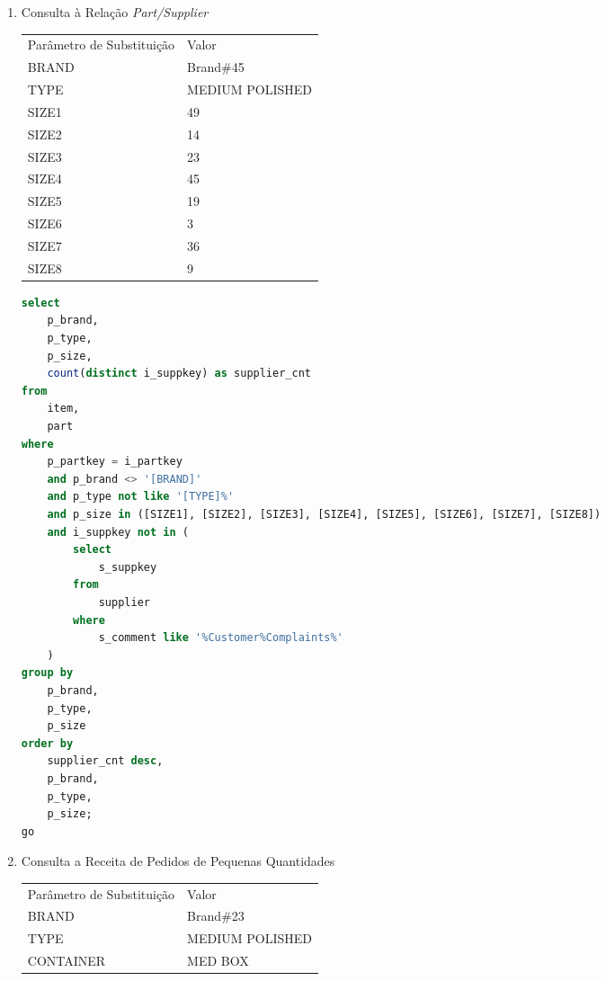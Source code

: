 \begin{enumerate}
\begin{lstlisting}[language=SQL]
select
	s_suppkey,
	s_name,
	s_address,
	s_phone,
	total_revenue
from
	supplier,
	revenue[STREAM_ID]
where
	s_suppkey = supplier_no
	and total_revenue = (
		select
			max(total_revenue)
		from
			revenue[STREAM_ID]
	)
order by
	s_suppkey;

drop view revenue[STREAM_ID];
	\end{lstlisting}

\item Consulta à Relação \textit{Part/Supplier}

\begin{tabular}{ll}
	Parâmetro de Substituição & Valor\\
	BRAND & Brand$\#$45\\
	TYPE & MEDIUM POLISHED \\
	SIZE1 & 49 \\
	SIZE2 & 14 \\
	SIZE3 & 23 \\
	SIZE4 & 45 \\
	SIZE5 & 19 \\
	SIZE6 &  3 \\
	SIZE7 & 36 \\
	SIZE8 &  9 \\
\end{tabular}

	\begin{lstlisting}[language=SQL]
select
    p_brand,
    p_type,
    p_size,
    count(distinct i_suppkey) as supplier_cnt
from
	item,
    part
where
    p_partkey = i_partkey
    and p_brand <> '[BRAND]'
    and p_type not like '[TYPE]%'
    and p_size in ([SIZE1], [SIZE2], [SIZE3], [SIZE4], [SIZE5], [SIZE6], [SIZE7], [SIZE8])
    and i_suppkey not in (
        select
            s_suppkey
        from
            supplier
        where
            s_comment like '%Customer%Complaints%'
    )
group by
    p_brand,
    p_type,
    p_size
order by
    supplier_cnt desc,
    p_brand,
    p_type,
    p_size;
go
	\end{lstlisting}

\item Consulta a Receita de Pedidos de Pequenas Quantidades

\begin{tabular}{ll}
	Parâmetro de Substituição & Valor\\
	BRAND & Brand$\#$23\\
	TYPE & MEDIUM POLISHED \\
	CONTAINER & MED BOX \\
\end{tabular}


\end{enumerate}
